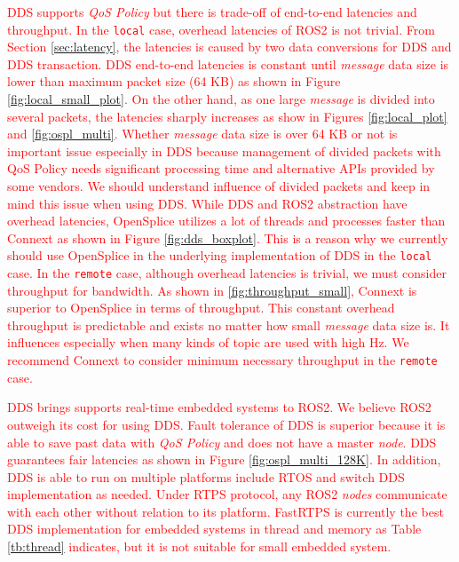 \documentclass{sig-alternate-05-2015}
\begin{document}
\textcolor{red}{
DDS supports \emph{QoS Policy} but there is trade-off of end-to-end latencies and throughput.
In the \texttt{local} case, overhead latencies of ROS2 is not trivial.
From Section \ref{sec:latency}, the latencies is caused by two data conversions for DDS and DDS transaction.
DDS end-to-end latencies is constant until \emph{message} data size is lower than maximum packet size (64 KB) as shown in Figure \ref{fig:local_small_plot}.
On the other hand, as one large \emph{message} is divided into several packets, the latencies sharply increases as show in Figures \ref{fig:local_plot} and \ref{fig:ospl_multi}.
Whether \emph{message} data size is over 64 KB or not is important issue especially in DDS because management of divided packets with QoS Policy needs significant processing time and alternative APIs provided by some vendors.
We should understand influence of divided packets and keep in mind this issue when using DDS.
While DDS and ROS2 abstraction have overhead latencies, OpenSplice utilizes a lot of threads and processes faster than Connext as shown in Figure \ref{fig:dds_boxplot}.
This is a reason why we currently should use OpenSplice in the underlying implementation of DDS in the \texttt{local} case.
In the \texttt{remote} case, although overhead latencies is trivial, we must consider throughput for bandwidth.
As shown in \ref{fig:throughput_small}, Connext is superior to OpenSplice in terms of throughput.
This constant overhead throughput is predictable and exists no matter how small \emph{message} data size is.
It influences especially when many kinds of topic are used with high Hz.
We recommend Connext to consider minimum necessary throughput in the \texttt{remote} case.
}

\textcolor{red}{
DDS brings supports real-time embedded systems to ROS2.
We believe ROS2 outweigh its cost for using DDS.
Fault tolerance of DDS is superior because it is able to save past data with \emph{QoS Policy} and does not have a master \emph{node}.
DDS guarantees fair latencies as shown in Figure \ref{fig:ospl_multi_128K}.
In addition, DDS is able to run on multiple platforms include RTOS and switch DDS implementation as needed.
Under RTPS protocol, any ROS2 \emph{nodes} communicate with each other without relation to its platform.
FastRTPS is currently the best DDS implementation for embedded systems in thread and memory as Table \ref{tb:thread} indicates, but it is not suitable for small embedded system.
}
\end{document}
